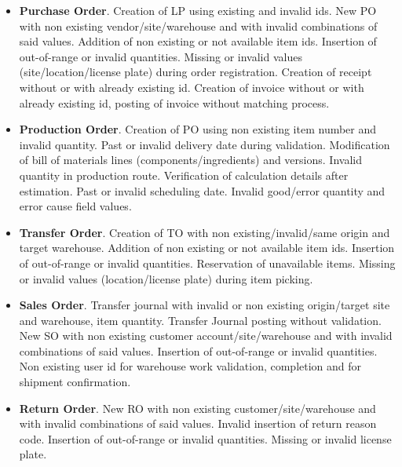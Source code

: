 \begin{itemize}
    \item \textbf{Purchase Order}. Creation of LP using existing and invalid ids. New PO with non existing vendor/site/warehouse and with invalid combinations of said values. Addition of non existing or not available item ids. Insertion of out-of-range or invalid quantities. Missing or invalid values (site/location/license plate) during order registration. Creation of receipt without or with already existing id. Creation of invoice without or with already existing id, posting of invoice without matching process. 
    \item \textbf{Production Order}. Creation of PO using non existing item number and invalid quantity. Past or invalid delivery date during validation. Modification of bill of materials lines (components/ingredients) and versions. Invalid quantity in production route. Verification of calculation details after estimation. Past or invalid scheduling date. Invalid good/error quantity and error cause field values.
    \item \textbf{Transfer Order}. Creation of TO with non existing/invalid/same origin and target warehouse. Addition of non existing or not available item ids. Insertion of out-of-range or invalid quantities. Reservation of unavailable items. Missing or invalid values (location/license plate) during item picking.
    \item \textbf{Sales Order}. Transfer journal with invalid or non existing origin/target site and warehouse, item quantity. Transfer Journal posting without validation. New SO with non existing customer account/site/warehouse and with invalid combinations of said values. Insertion of out-of-range or invalid quantities. Non existing user id for warehouse work validation, completion and for shipment confirmation.
    \item \textbf{Return Order}. New RO with non existing customer/site/warehouse and with invalid combinations of said values. Invalid insertion of return reason code. Insertion of out-of-range or invalid quantities. Missing or invalid license plate.
\end{itemize}


